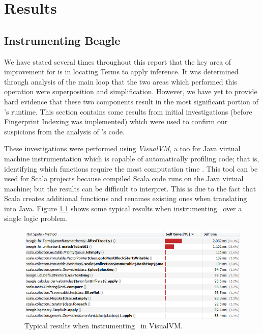 
\chapter{Results}
\label{cha:results}

\section{Instrumenting Beagle}
\label{section:instr}

We have stated several times throughout this report that the key area of improvement for \beagle
is in locating Terms to apply inference. It was determined through analysis of the main loop
that the two areas which performed this operation were superposition and simplification.
However, we have yet to provide hard evidence that these two components result in the
most significant portion of \beagle's runtime.
This section contains some results from initial investigations (before Fingerprint Indexing
was implemented) which were used to confirm our suspicions from the analysis of \beagle's code.

These investigations were performed using \emph{VisualVM}, a too for Java virtual machine
instrumentation which is capable of automatically profiling code; that is, identifying
which functions require the most computation time \cite{visualvm}. This tool can
be used for Scala projects because compiled Scala code runs on the Java virtual machine;
but the results can be difficult to interpret. This is due to the fact that Scala
creates additional functions and renames existing ones when translating into Java.
Figure \ref{fig:visvm} shows some typical results when instrumenting \beagle\ over
a single logic problem.

\begin{figure}[H]
  \includegraphics[width=\textwidth]{resources/visualvm}
  \caption{Typical results when instrumenting \beagle\  in VisualVM.}
  \label{fig:visvm}
\end{figure}


